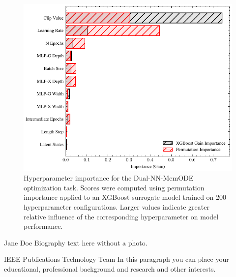 \documentclass[lettersize,journal]{IEEEtran}
\begin{document}
\begin{figure}[!t]
  \centering
  \includegraphics[width=\linewidth]{mms_figs/xgboost_permutation_importance.pdf}
  \caption{Hyperparameter importance for the Dual-NN-MemODE optimization task. Scores were computed using permutation importance applied to an XGBoost surrogate model trained on 200 hyperparameter configurations. Larger values indicate greater relative influence of the corresponding hyperparameter on model performance.}
  \label{fig:hyperparameter_importance}
\end{figure}






\printbibliography

\begin{IEEEbiographynophoto}{Jane Doe}
  Biography text here without a photo.
\end{IEEEbiographynophoto}

\begin{IEEEbiography}{IEEE Publications Technology Team}
  In this paragraph you can place your educational, professional background and research and other interests.\end{IEEEbiography}
\end{document}
